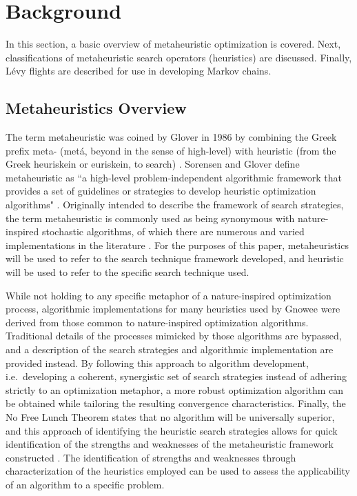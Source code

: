 \documentclass{article}                                                                           %
\begin{document}
\section{Background}
\label{sec:background}
In this section, a basic overview of metaheuristic optimization is covered.
Next, classifications of metaheuristic search operators (heuristics) are discussed.
Finally, Lévy flights are described for use in developing Markov chains.

\subsection{Metaheuristics Overview}
The term metaheuristic was coined by Glover in 1986 by combining the Greek prefix meta- (metá, beyond in the sense of high-level) with heuristic (from the Greek heuriskein or euriskein, to search) \cite{Sorensen2016, Glover1986}.  
Sorensen and Glover define metaheuristic as ``a high-level problem-independent algorithmic framework that provides a set of guidelines or strategies to develop heuristic optimization  algorithms" \cite{Sorensen2016}.
Originally intended to describe the framework of search strategies, the term metaheuristic is commonly used as being synonymous with nature-inspired stochastic algorithms, of which there are numerous and varied implementations in the literature \cite{Yang2014, Fister2013}.  
For the purposes of this paper, metaheuristics will be used to refer to the search technique framework developed, and heuristic will be used to refer to the specific search technique used.   

While not holding to any specific metaphor of a nature-inspired optimization process, algorithmic implementations for many heuristics used by Gnowee were derived from those common to nature-inspired optimization algorithms.
Traditional details of the processes mimicked by those algorithms are bypassed, and a description of the search strategies and algorithmic implementation are provided instead.  
By following this approach to algorithm development, i.e.\ developing a coherent, synergistic set of search strategies instead of adhering strictly to an optimization metaphor, a more robust optimization algorithm can be obtained while tailoring the resulting convergence characteristics.  
Finally, the No Free Lunch Theorem states that no algorithm will be universally superior, and this approach of identifying the heuristic search strategies allows for quick identification of the strengths and weaknesses of the metaheuristic framework constructed \cite{Wolpert1997}.
The identification of strengths and weaknesses through characterization of the heuristics employed can be used to assess the applicability of an algorithm to a specific problem.
\end{document}

